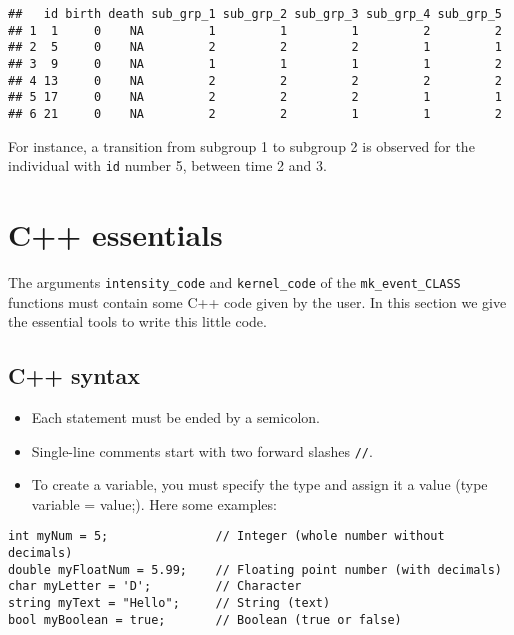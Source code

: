 \begin{verbatim}
##   id birth death sub_grp_1 sub_grp_2 sub_grp_3 sub_grp_4 sub_grp_5
## 1  1     0    NA         1         1         1         2         2
## 2  5     0    NA         2         2         2         1         1
## 3  9     0    NA         1         1         1         1         2
## 4 13     0    NA         2         2         2         2         2
## 5 17     0    NA         2         2         2         1         1
## 6 21     0    NA         2         2         1         1         2
\end{verbatim}

For instance, a transition from subgroup 1 to subgroup 2 is observed for the individual with \texttt{id} number 5, between time 2 and 3.

\hypertarget{essentials}{%
\section{C++ essentials}\label{essentials}}

The arguments \texttt{intensity\_code} and \texttt{kernel\_code} of the \texttt{mk\_event\_CLASS} functions must contain some C++ code given by the user. In this section we give the essential tools to write this little code.

\hypertarget{c-syntax}{%
\subsection{C++ syntax}\label{c-syntax}}

\begin{itemize}
\tightlist
\item
  Each statement must be ended by a semicolon.
\item
  Single-line comments start with two forward slashes \texttt{//}.
\item
  To create a variable, you must specify the type and assign it a value (type variable = value;). Here some examples:
\end{itemize}

\begin{verbatim}
int myNum = 5;               // Integer (whole number without decimals)
double myFloatNum = 5.99;    // Floating point number (with decimals)
char myLetter = 'D';         // Character
string myText = "Hello";     // String (text)
bool myBoolean = true;       // Boolean (true or false)
\end{verbatim}


